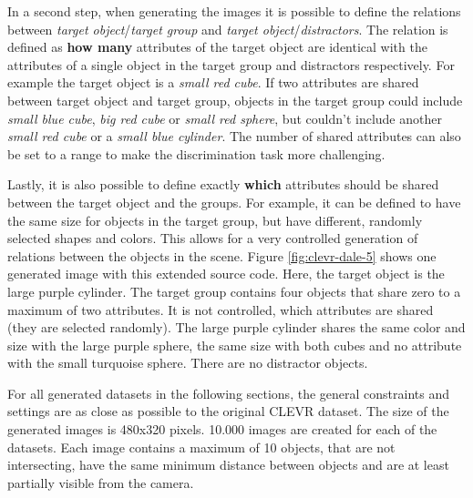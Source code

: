 In a second step, when generating the images it is possible to define the relations between \emph{target object}/\emph{target group} and \emph{target object}/\emph{distractors}.
The relation is defined as \textbf{how many} attributes of the target object are identical with the attributes of a single object in the target group and distractors respectively.
For example the target object is a \emph{small red cube}.
If two attributes are shared between target object and target group, objects in the target group could include \emph{small blue cube}, \emph{big red cube} or \emph{small red sphere}, but couldn't include another \emph{small red cube} or a \emph{small blue cylinder}.
The number of shared attributes can also be set to a range to make the discrimination task more challenging.

Lastly, it is also possible to define exactly \textbf{which} attributes should be shared between the target object and the groups.
For example, it can be defined to have the same size for objects in the target group, but have different, randomly selected shapes and colors.
This allows for a very controlled generation of relations between the objects in the scene.
Figure \ref{fig:clevr-dale-5} shows one generated image with this extended source code.
Here, the target object is the large purple cylinder.
The target group contains four objects that share zero to a maximum of two attributes.
It is not controlled, which attributes are shared (they are selected randomly). The large purple cylinder shares the same color and size with the large purple sphere, the same size with both cubes and no attribute with the small turquoise sphere.
There are no distractor objects.

For all generated datasets in the following sections, the general constraints and settings are as close as possible to the original CLEVR dataset.
The size of the generated images is 480x320 pixels.
10.000 images are created for each of the datasets.
Each image contains a maximum of 10 objects, that are not intersecting, have the same minimum distance between objects and are at least partially visible from the camera.

